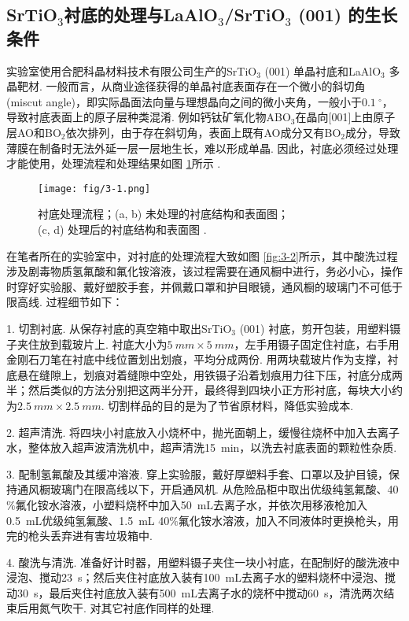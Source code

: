 \documentclass[12pt,a4paper,openany,twoside,UTF-8]{book}
\begin{document}
\subsection{ SrTiO$_3$衬底的处理与LaAlO$_3$/SrTiO$_3$ (001) 的生长条件}
实验室使用合肥科晶材料技术有限公司生产的SrTiO$_3$ (001) 单晶衬底和LaAlO$_3$ 多晶靶材. 一般而言，从商业途径获得的单晶衬底表面存在一个微小的斜切角 (miscut angle)，即实际晶面法向量与理想晶向之间的微小夹角，一般小于$\SI{0.1}{^\circ}$，导致衬底表面上的原子层种类混淆. 例如钙钛矿氧化物ABO$_3$在晶向[001]上由原子层AO和BO$_2$依次排列，由于存在斜切角，表面上既有AO成分又有BO$_2$成分，导致薄膜在制备时无法外延一层一层地生长，难以形成单晶. 因此，衬底必须经过处理才能使用，处理流程和处理结果如图 \ref{fig:3-1}所示 \cite{ref12}.
  
\begin{figure}[htbp]
\centering
\texttt{[image: fig/3-1.png]}
\caption{衬底处理流程；(a, b) 未处理的衬底结构和表面图；\\(c, d) 处理后的衬底结构和表面图 \cite{ref10}.}
\label{fig:3-1} 
\end{figure}

在笔者所在的实验室中，对衬底的处理流程大致如图 \ref{fig:3-2}所示，其中酸洗过程涉及剧毒物质氢氟酸和氟化铵溶液，该过程需要在通风橱中进行，务必小心，操作时穿好实验服、戴好塑胶手套，并佩戴口罩和护目眼镜，通风橱的玻璃门不可低于限高线. 过程细节如下：

1. 切割衬底. 从保存衬底的真空箱中取出SrTiO$_3$ (001) 衬底，剪开包装，用塑料镊子夹住放到载玻片上. 衬底大小为$\SI{5}{mm}\times\SI{5}{mm}$，左手用镊子固定住衬底，右手用金刚石刀笔在衬底中线位置划出划痕，平均分成两份. 用两块载玻片作为支撑，衬底悬在缝隙上，划痕对着缝隙中空处，用铁镊子沿着划痕用力往下压，衬底分成两半；然后类似的方法分别把这两半分开，最终得到四块小正方形衬底，每块大小约为$\SI{2.5}{mm}\times\SI{2.5}{mm}$. 切割样品的目的是为了节省原材料，降低实验成本.

2. 超声清洗. 将四块小衬底放入小烧杯中，抛光面朝上，缓慢往烧杯中加入去离子水，整体放入超声波清洗机中，超声清洗\SI{15}{min}，以洗去衬底表面的颗粒性杂质.

3. 配制氢氟酸及其缓冲溶液. 穿上实验服，戴好厚塑料手套、口罩以及护目镜，保持通风橱玻璃门在限高线以下，开启通风机. 从危险品柜中取出优级纯氢氟酸、40$\%$氟化铵水溶液，小塑料烧杯中加入\SI{50}{mL}去离子水，并依次用移液枪加入\SI{0.5}{mL}优级纯氢氟酸、\SI{1.5}{mL} 40$\%$氟化铵水溶液，加入不同液体时更换枪头，用完的枪头丢弃进有害垃圾箱中.

4. 酸洗与清洗. 准备好计时器，用塑料镊子夹住一块小衬底，在配制好的酸洗液中浸泡、搅动\SI{23}{s}；然后夹住衬底放入装有\SI{100}{mL}去离子水的塑料烧杯中浸泡、搅动\SI{30}{s}，最后夹住衬底放入装有\SI{500}{mL}去离子水的烧杯中搅动\SI{60}{s}，清洗两次结束后用氮气吹干. 对其它衬底作同样的处理. 
\end{document}
